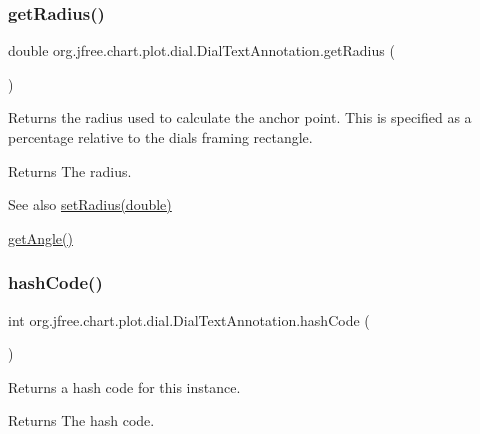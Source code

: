\subsubsection{\texorpdfstring{get\+Radius()}{getRadius()}}
{\footnotesize\ttfamily double org.\+jfree.\+chart.\+plot.\+dial.\+Dial\+Text\+Annotation.\+get\+Radius (\begin{DoxyParamCaption}{ }\end{DoxyParamCaption})}

Returns the radius used to calculate the anchor point. This is specified as a percentage relative to the dial\textquotesingle{}s framing rectangle.

\begin{DoxyReturn}{Returns}
The radius.
\end{DoxyReturn}
\begin{DoxySeeAlso}{See also}
\mbox{\hyperlink{classorg_1_1jfree_1_1chart_1_1plot_1_1dial_1_1_dial_text_annotation_a965ee047f464d6e4d7b8ec01f18bf913}{set\+Radius(double)}} 

\mbox{\hyperlink{classorg_1_1jfree_1_1chart_1_1plot_1_1dial_1_1_dial_text_annotation_ac5edd17a18442f02b1fda90fdc71b5ba}{get\+Angle()}} 
\end{DoxySeeAlso}
\mbox{\label{classorg_1_1jfree_1_1chart_1_1plot_1_1dial_1_1_dial_text_annotation_a546b56589ad85c21e981c8f4582b73dd}} 
\subsubsection{\texorpdfstring{hash\+Code()}{hashCode()}}
{\footnotesize\ttfamily int org.\+jfree.\+chart.\+plot.\+dial.\+Dial\+Text\+Annotation.\+hash\+Code (\begin{DoxyParamCaption}{ }\end{DoxyParamCaption})}

Returns a hash code for this instance.

\begin{DoxyReturn}{Returns}
The hash code. 
\end{DoxyReturn}
\mbox{\label{classorg_1_1jfree_1_1chart_1_1plot_1_1dial_1_1_dial_text_annotation_a341292864b0a591544a890548e4d68d5}} 
